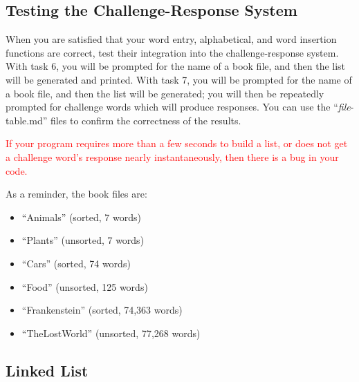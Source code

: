 \begin{description}
\end{description}


\subsection{Testing the Challenge-Response System}

When you are satisfied that your word entry, alphabetical, and word insertion functions are correct, test their integration into the challenge-response system.
With task 6, you will be prompted for the name of a book file, and then the list will be generated and printed.
With task 7, you will be prompted for the name of a book file, and then the list will be generated; you will then be repeatedly prompted for challenge words which will produce responses.
You can use the ``\textit{file}-table.md'' files to confirm the correctness of the results.

\textcolor{red}{If your program requires more than a few seconds to build a list, or does not get a challenge word's response nearly instantaneously, then there is a bug in your code.}

\begin{description}
\end{description}

As a reminder, the book files are:

\begin{itemize}
    \item ``Animals'' (sorted, 7 words)
    \item ``Plants'' (unsorted, 7 words)
    \item ``Cars'' (sorted, 74 words)
    \item ``Food'' (unsorted, 125 words)
    \item ``Frankenstein'' (sorted, 74,363 words)
    \item ``TheLostWorld'' (unsorted, 77,268 words)
\end{itemize}


\subsection{Linked List}

